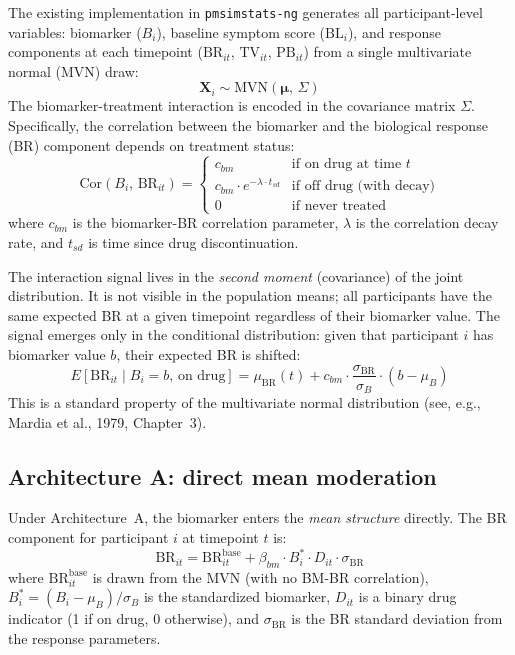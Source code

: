 \documentclass[11pt]{article}
\begin{document}
The existing implementation in \texttt{pmsimstats-ng}
generates all participant-level variables: biomarker ($B_i$),
baseline symptom score ($\text{BL}_i$), and response
components at each timepoint ($\text{BR}_{it}$,
$\text{TV}_{it}$, $\text{PB}_{it}$) from a single
multivariate normal (MVN) draw:
%
\begin{equation}
  \mathbf{X}_i \sim \text{MVN}(\boldsymbol{\mu},\,\Sigma)
\end{equation}
%
The biomarker-treatment interaction is encoded in the
covariance matrix $\Sigma$. Specifically, the correlation
between the biomarker and the biological response (BR)
component depends on treatment status:
%
\begin{equation}\label{eq:mvn-cor}
  \text{Cor}(B_i,\,\text{BR}_{it}) =
  \begin{cases}
    c_{bm} & \text{if on drug at time } t \\
    c_{bm} \cdot e^{-\lambda \cdot t_{sd}} &
      \text{if off drug (with decay)} \\
    0 & \text{if never treated}
  \end{cases}
\end{equation}
%
where $c_{bm}$ is the biomarker-BR correlation parameter,
$\lambda$ is the correlation decay rate, and $t_{sd}$ is time
since drug discontinuation.

The interaction signal lives in the \emph{second moment}
(covariance) of the joint distribution. It is not visible in
the population means; all participants have the same expected
BR at a given timepoint regardless of their biomarker value.
The signal emerges only in the conditional distribution:
given that participant $i$ has biomarker value $b$, their
expected BR is shifted:
%
\begin{equation}\label{eq:cond-exp}
  E[\text{BR}_{it} \mid B_i = b,\,\text{on drug}]
  = \mu_{\text{BR}}(t) + c_{bm} \cdot
    \frac{\sigma_{\text{BR}}}{\sigma_B}
    \cdot (b - \mu_B)
\end{equation}
%
This is a standard property of the multivariate normal
distribution (see, e.g., Mardia et al., 1979, Chapter~3).

\subsection{Architecture A: direct mean moderation}

Under Architecture~A, the biomarker enters the
\emph{mean structure} directly. The BR component for
participant $i$ at timepoint $t$ is:
%
\begin{equation}\label{eq:arch-a}
  \text{BR}_{it} = \text{BR}_{it}^{\text{base}}
  + \beta_{bm} \cdot B_i^{*} \cdot D_{it} \cdot \sigma_{\text{BR}}
\end{equation}
%
where $\text{BR}_{it}^{\text{base}}$ is drawn from the MVN
(with no BM-BR correlation), $B_i^{*} = (B_i - \mu_B) /
\sigma_B$ is the standardized biomarker, $D_{it}$ is a binary
drug indicator (1 if on drug, 0 otherwise), and
$\sigma_{\text{BR}}$ is the BR standard deviation from the
response parameters.
\end{document}
